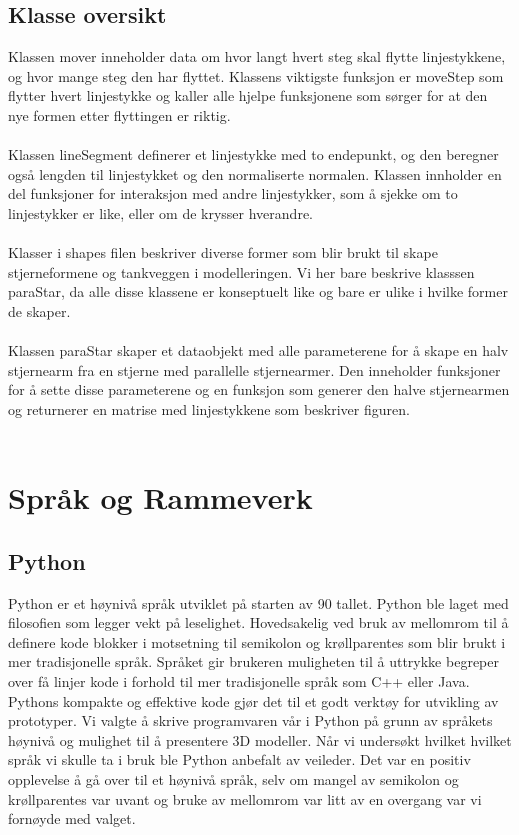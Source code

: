 \subsection{Klasse oversikt}
Klassen mover inneholder data om hvor langt hvert steg skal flytte linjestykkene, og hvor mange steg den har flyttet. Klassens viktigste funksjon er moveStep som flytter hvert linjestykke og kaller alle hjelpe funksjonene som sørger for at den nye formen etter flyttingen er riktig.\\ \\
Klassen lineSegment definerer et linjestykke med to endepunkt, og den beregner også lengden til linjestykket og den normaliserte normalen. Klassen innholder en del funksjoner for interaksjon med andre linjestykker, som å sjekke om to linjestykker er like, eller om de krysser hverandre.\\ \\
Klasser i shapes filen beskriver diverse former som blir brukt til skape stjerneformene og tankveggen i modelleringen. Vi her bare beskrive klasssen paraStar, da alle disse klassene er konseptuelt like og bare er ulike i hvilke former de skaper.\\ \\
Klassen paraStar skaper et dataobjekt med alle parameterene for å skape en halv stjernearm fra en stjerne med parallelle stjernearmer. Den inneholder funksjoner for å sette disse parameterene og en funksjon som generer den halve stjernearmen og returnerer en matrise med linjestykkene som beskriver figuren.\\ \\

\section{Språk og Rammeverk}

\subsection{Python}
Python er et høynivå språk utviklet på starten av 90 tallet. Python ble laget med filosofien som legger vekt på leselighet. Hovedsakelig ved bruk av mellomrom til å definere kode blokker i motsetning til semikolon og krøllparentes som blir brukt i mer tradisjonelle språk. Språket gir brukeren muligheten til å uttrykke begreper over få linjer kode i forhold til mer tradisjonelle språk som C++ eller Java. Pythons kompakte og effektive kode gjør det til et godt verktøy for utvikling av prototyper. Vi valgte å skrive programvaren vår i Python på grunn av språkets høynivå og mulighet til å presentere 3D modeller. Når vi undersøkt hvilket hvilket språk vi skulle ta i bruk ble Python anbefalt av veileder. Det var en positiv opplevelse å gå over til et høynivå språk, selv om mangel av semikolon og krøllparentes var uvant og bruke av mellomrom var litt av en overgang var vi fornøyde med valget. 

